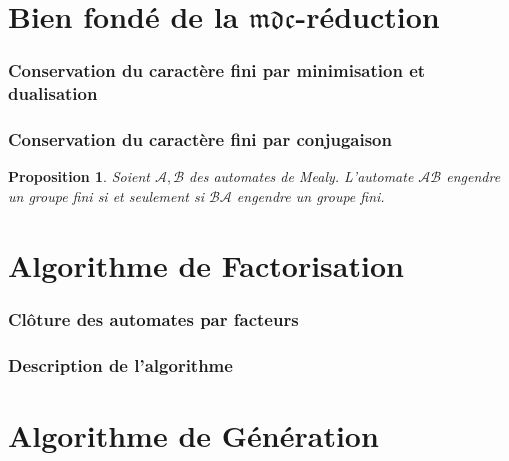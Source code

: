 \documentclass[11pt]{beamer}
\newtheorem{prop}{Proposition}
\begin{document}
	\section{Bien fondé de la $\mathfrak{mdc}$-réduction}
	
	\begin{frame}
		\frametitle{Conservation du caractère fini par minimisation et dualisation}
	\end{frame}
	
	\begin{frame}
		\frametitle{Conservation du caractère fini par conjugaison}
		
		\begin{prop} %
			Soient $\mathcal{A}, \mathcal{B}$ des automates de Mealy.
			L'automate $\mathcal{A}\mathcal{B}$ engendre un groupe fini si et seulement si $\mathcal{B}\mathcal{A}$ engendre un groupe fini.
		\end{prop}
	\end{frame}

	\section{Algorithme de Factorisation}
	
	\begin{frame}
		\frametitle{Clôture des automates par facteurs}
	\end{frame}

	\begin{frame}
		\frametitle{Description de l'algorithme}
	\end{frame}

	\section{Algorithme de Génération}
	
\end{document}

